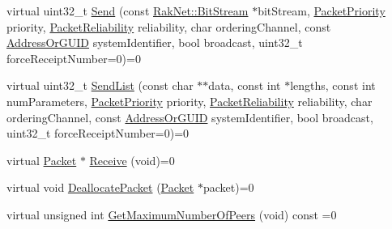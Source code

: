 \begin{DoxyCompactItemize}
\item 
virtual uint32\-\_\-t \hyperlink{class_rak_net_1_1_rak_peer_interface_a6d9a5415556a9c138854cc05c707b8e7}{Send} (const \hyperlink{class_rak_net_1_1_bit_stream}{Rak\-Net\-::\-Bit\-Stream} $\ast$bit\-Stream, \hyperlink{_packet_priority_8h_a659378374e516180f93640c79f59705c}{Packet\-Priority} priority, \hyperlink{_packet_priority_8h_ae41fa01235e99dced384d137fa874a7e}{Packet\-Reliability} reliability, char ordering\-Channel, const \hyperlink{struct_rak_net_1_1_address_or_g_u_i_d}{Address\-Or\-G\-U\-I\-D} system\-Identifier, bool broadcast, uint32\-\_\-t force\-Receipt\-Number=0)=0
\item 
virtual uint32\-\_\-t \hyperlink{class_rak_net_1_1_rak_peer_interface_a508111f60de06beb55a65a2b811d557c}{Send\-List} (const char $\ast$$\ast$data, const int $\ast$lengths, const int num\-Parameters, \hyperlink{_packet_priority_8h_a659378374e516180f93640c79f59705c}{Packet\-Priority} priority, \hyperlink{_packet_priority_8h_ae41fa01235e99dced384d137fa874a7e}{Packet\-Reliability} reliability, char ordering\-Channel, const \hyperlink{struct_rak_net_1_1_address_or_g_u_i_d}{Address\-Or\-G\-U\-I\-D} system\-Identifier, bool broadcast, uint32\-\_\-t force\-Receipt\-Number=0)=0
\item 
virtual \hyperlink{struct_rak_net_1_1_packet}{Packet} $\ast$ \hyperlink{class_rak_net_1_1_rak_peer_interface_a1c50453d9dee600920aeabd62ad7c119}{Receive} (void)=0
\item 
virtual void \hyperlink{class_rak_net_1_1_rak_peer_interface_a21b929aba61ce69aab32871db33d6ede}{Deallocate\-Packet} (\hyperlink{struct_rak_net_1_1_packet}{Packet} $\ast$packet)=0
\item 
\hypertarget{class_rak_net_1_1_rak_peer_interface_abfe4c34f55a92b7c0fd90ff9bbb3f644}{virtual unsigned int \hyperlink{class_rak_net_1_1_rak_peer_interface_abfe4c34f55a92b7c0fd90ff9bbb3f644}{Get\-Maximum\-Number\-Of\-Peers} (void) const =0}\label{class_rak_net_1_1_rak_peer_interface_abfe4c34f55a92b7c0fd90ff9bbb3f644}


\end{DoxyCompactItemize}
